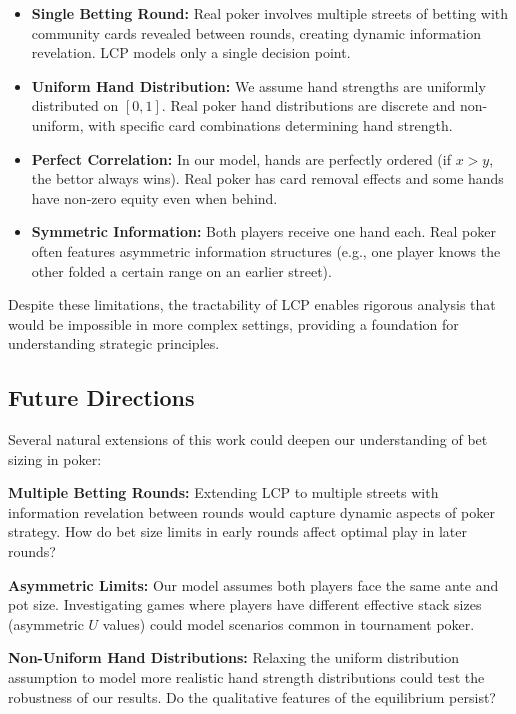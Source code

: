 \documentclass[../../main/main.tex]{subfiles}
\begin{document}
\begin{itemize}
    \item \textbf{Single Betting Round:} Real poker involves multiple streets of betting with community cards revealed between rounds, creating dynamic information revelation. LCP models only a single decision point.

    \item \textbf{Uniform Hand Distribution:} We assume hand strengths are uniformly distributed on $[0,1]$. Real poker hand distributions are discrete and non-uniform, with specific card combinations determining hand strength.

    \item \textbf{Perfect Correlation:} In our model, hands are perfectly ordered (if $x > y$, the bettor always wins). Real poker has card removal effects and some hands have non-zero equity even when behind.

    \item \textbf{Symmetric Information:} Both players receive one hand each. Real poker often features asymmetric information structures (e.g., one player knows the other folded a certain range on an earlier street).
\end{itemize}

Despite these limitations, the tractability of LCP enables rigorous analysis that would be impossible in more complex settings, providing a foundation for understanding strategic principles.

\subsection{Future Directions}

Several natural extensions of this work could deepen our understanding of bet sizing in poker:

\textbf{Multiple Betting Rounds:} Extending LCP to multiple streets with information revelation between rounds would capture dynamic aspects of poker strategy. How do bet size limits in early rounds affect optimal play in later rounds?

\textbf{Asymmetric Limits:} Our model assumes both players face the same ante and pot size. Investigating games where players have different effective stack sizes (asymmetric $U$ values) could model scenarios common in tournament poker.

\textbf{Non-Uniform Hand Distributions:} Relaxing the uniform distribution assumption to model more realistic hand strength distributions could test the robustness of our results. Do the qualitative features of the equilibrium persist?
\end{document}
